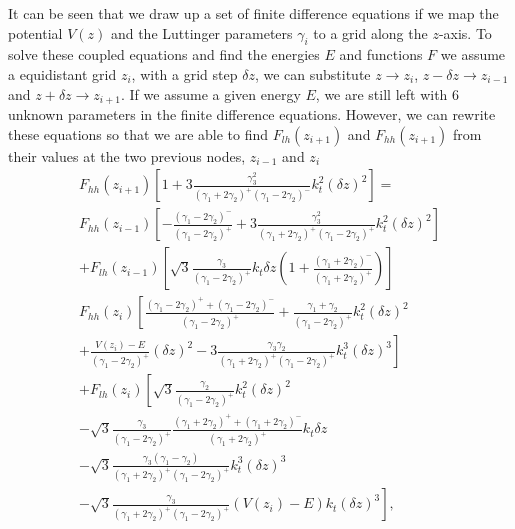 It can be seen that we draw up a set of finite difference equations
if we map the potential $V(z)$ and the Luttinger parameters $\gamma_{i}$
to a grid along the $z$-axis. To solve these coupled equations and
find the energies $E$ and functions $F$ we assume a equidistant
grid $z_{i}$, with a grid step $\delta z$, we can substitute $z\rightarrow z_{i}$,
$z-\delta z\rightarrow z_{i-1}$ and $z+\delta z\rightarrow z_{i+1}$.
If we assume a given energy $E$, we are still left with 6 unknown
parameters in the finite difference equations. However, we can rewrite
these equations so that we are able to find $F_{lh}(z_{i+1})$ and
$F_{hh}(z_{i+1})$ from their values at the two previous nodes, $z_{i-1}$
and $z_{i}$\begin{multline}
F_{hh}(z_{i+1})\left[1+3\frac{\gamma_{3}^{2}}{\left(\gamma_{1}+2\gamma_{2}\right)^{+}\left(\gamma_{1}-2\gamma_{2}\right)^{-}}k_{t}^{2}(\delta z)^{2}\right]=\\
F_{hh}(z_{i-1})\left[-\frac{\left(\gamma_{1}-2\gamma_{2}\right)^{-}}{\left(\gamma_{1}-2\gamma_{2}\right)^{+}}+3\frac{\gamma_{3}^{2}}{\left(\gamma_{1}+2\gamma_{2}\right)^{+}\left(\gamma_{1}-2\gamma_{2}\right)^{+}}k_{t}^{2}(\delta z)^{2}\right]\\
+F_{lh}(z_{i-1})\left[\sqrt{3}\frac{\gamma_{3}}{\left(\gamma_{1}-2\gamma_{2}\right)^{+}}k_{t}\delta z\left(1+\frac{\left(\gamma_{1}+2\gamma_{2}\right)^{-}}{\left(\gamma_{1}+2\gamma_{2}\right)^{+}}\right)\right]\\
F_{hh}(z_{i})\left[\frac{\left(\gamma_{1}-2\gamma_{2}\right)^{+}+\left(\gamma_{1}-2\gamma_{2}\right)^{-}}{\left(\gamma_{1}-2\gamma_{2}\right)^{+}}+\frac{\gamma_{1}+\gamma_{2}}{\left(\gamma_{1}-2\gamma_{2}\right)^{+}}k_{t}^{2}(\delta z)^{2}\right.\\
+\left.\frac{V(z_{i})-E}{\left(\gamma_{1}-2\gamma_{2}\right)^{+}}(\delta z)^{2}-3\frac{\gamma_{3}\gamma_{2}}{\left(\gamma_{1}+2\gamma_{2}\right)^{+}\left(\gamma_{1}-2\gamma_{2}\right)^{+}}k_{t}^{3}(\delta z)^{3}\right]\\
+F_{lh}(z_{i})\left[\sqrt{3}\frac{\gamma_{2}}{\left(\gamma_{1}-2\gamma_{2}\right)^{+}}k_{t}^{2}(\delta z)^{2}\right.\\
-\sqrt{3}\frac{\gamma_{3}}{\left(\gamma_{1}-2\gamma_{2}\right)^{+}}\frac{\left(\gamma_{1}+2\gamma_{2}\right)^{+}+\left(\gamma_{1}+2\gamma_{2}\right)^{-}}{\left(\gamma_{1}+2\gamma_{2}\right)^{+}}k_{t}\delta z\\
-\sqrt{3}\frac{\gamma_{3}\left(\gamma_{1}-\gamma_{2}\right)}{\left(\gamma_{1}+2\gamma_{2}\right)^{+}\left(\gamma_{1}-2\gamma_{2}\right)^{+}}k_{t}^{3}(\delta z)^{3}\\
\left.-\sqrt{3}\frac{\gamma_{3}}{\left(\gamma_{1}+2\gamma_{2}\right)^{+}\left(\gamma_{1}-2\gamma_{2}\right)^{+}}\left(V(z_{i})-E\right)k_{t}(\delta z)^{3}\right],\end{multline}
